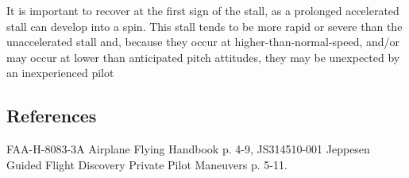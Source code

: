 It is important to recover at the first sign of the stall, as a prolonged
accelerated stall can develop into a spin. This stall tends to be more rapid or
severe than the unaccelerated stall and, because they occur at
higher-than-normal-speed, and/or may occur at lower than anticipated pitch
attitudes, they may be unexpected by an inexperienced pilot

\subsection{References}

FAA-H-8083-3A Airplane Flying Handbook p. 4-9, JS314510-001 Jeppesen Guided
Flight Discovery Private Pilot Maneuvers p. 5-11.
